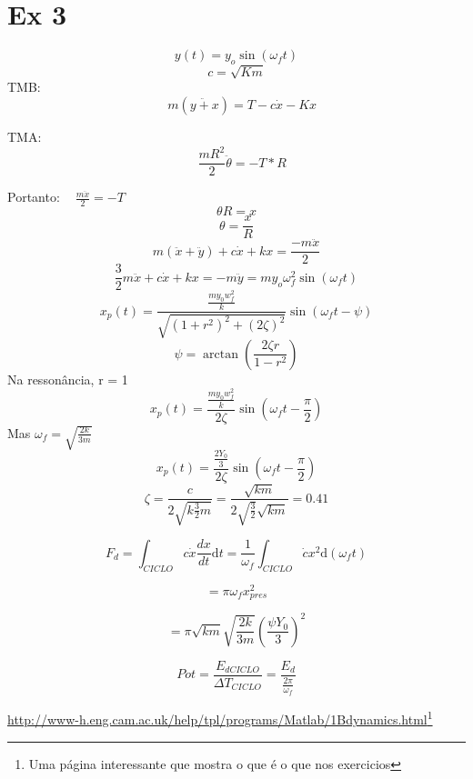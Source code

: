 
\section{Ex 3}



\[y(t)=y_{o}\sin(\omega_{f}t)\]
\[c = \sqrt{Km}\]
TMB:\[\ \ \ \  m(\ddot{y+x}) = T - c\dot{x}-Kx \]

TMA:\[\ \ \ \  \frac{mR^{2}}{2}\ddot{\theta} = -T*R \]



Portanto: $\ \ \ \  \frac{m\ddot{x}}{2}=-T $
	\[ \theta R=x \]
	\[\theta = \frac{x}{R}\]
	\[	m(\ddot{x}+\ddot{y})+c\dot{x}+kx=\frac{-m\ddot{x}}{2}\]
	\[\frac{3}{2}m\ddot{x}+c\dot{x}+kx=-m\ddot{y}=my_{o}\omega_{f}^{2}\sin(\omega_{f}t)\]
	\[x_{p}(t)=\frac{\frac{my_{0}w_{f}^{2}}{k}}{\sqrt{(1+r^{2})^{2}+(2\zeta)^{2}}}\sin(\omega_{f}t-\psi)\]
\[	\psi=\arctan(\frac{2\zeta r}{1-r^{2}})\]
	Na ressonância, r = 1
	\[x_{p}(t)=\frac{\frac{my_{0}w_{f}^{2}}{k}}{2\zeta}\sin(\omega_{f}t-\frac{\pi}{2})\]
	Mas $\omega_{f}=\sqrt{\frac{2k}{3m}}$  
	\[	x_{p}(t)=\frac{\frac{2Y_{0}}{3}}{2\zeta}\sin(\omega_{f}t-\frac{\pi}{2})\]
\[	\zeta=\frac{c}{2\sqrt{k\frac{3}{2}m}} = \frac{\sqrt{km}}{2\sqrt{\frac{3}{2}}\sqrt{km}}=0.41\]

\[	F_{d}=\int_{CICLO}^{}{c\dot{x}\frac{dx}{dt}\text{d}t}=\frac{1}{\omega_{f}}\int_{CICLO}^{}{\dot{c}x^{2}\text{d}(\omega_{f}t)}\]

\[ = \pi\omega_{f}x_{p res}^{2}\]

\[ = \pi\sqrt{km}\sqrt{\frac{2k}{3m}}(\frac{\psi Y_{0}}{3})^{2}\]

\[Pot = \frac{E_{d CICLO}}{\Delta T _{CICLO}} = \frac{E_{d}}{\frac{2\pi}{\omega_{f}}}\]

\url{http://www-h.eng.cam.ac.uk/help/tpl/programs/Matlab/1Bdynamics.html}\footnote{Uma página interessante que mostra o que é o que nos exercicios}